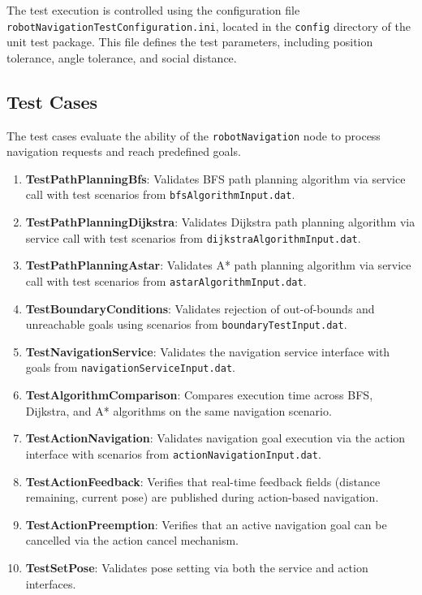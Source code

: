 \documentclass{CSSRforAfrica}
\begin{document}
\noindent The test execution is controlled using the configuration file \texttt{robotNavigationTestConfiguration.ini}, located in the \texttt{config} directory of the unit test package. This file defines the test parameters, including position tolerance, angle tolerance, and social distance.

\subsection{Test Cases}
The test cases evaluate the ability of the \texttt{robotNavigation} node to process navigation requests and reach predefined goals.

\begin{enumerate}
    \item \textbf{TestPathPlanningBfs}: Validates BFS path planning algorithm via service call with test scenarios from \texttt{bfsAlgorithmInput.dat}.
    \item \textbf{TestPathPlanningDijkstra}: Validates Dijkstra path planning algorithm via service call with test scenarios from \texttt{dijkstraAlgorithmInput.dat}.
    \item \textbf{TestPathPlanningAstar}: Validates A* path planning algorithm via service call with test scenarios from \texttt{astarAlgorithmInput.dat}.
    \item \textbf{TestBoundaryConditions}: Validates rejection of out-of-bounds and unreachable goals using scenarios from \texttt{boundaryTestInput.dat}.
    \item \textbf{TestNavigationService}: Validates the navigation service interface with goals from \texttt{navigationServiceInput.dat}.
    \item \textbf{TestAlgorithmComparison}: Compares execution time across BFS, Dijkstra, and A* algorithms on the same navigation scenario.
    \item \textbf{TestActionNavigation}: Validates navigation goal execution via the action interface with scenarios from \texttt{actionNavigationInput.dat}.
    \item \textbf{TestActionFeedback}: Verifies that real-time feedback fields (distance remaining, current pose) are published during action-based navigation.
    \item \textbf{TestActionPreemption}: Verifies that an active navigation goal can be cancelled via the action cancel mechanism.
    \item \textbf{TestSetPose}: Validates pose setting via both the service and action interfaces.
\end{enumerate}
\end{document}
